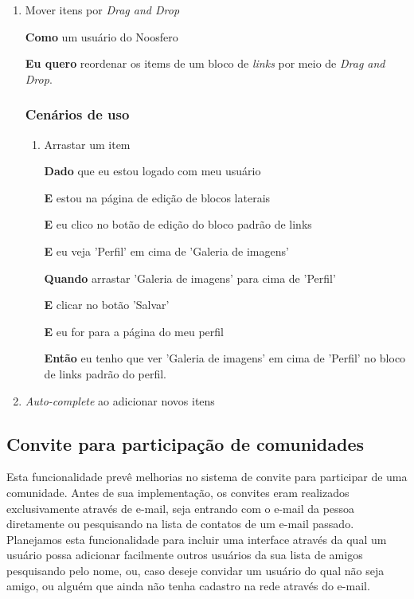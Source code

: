 \begin{enumerate}

\item Mover itens por \textit{Drag and Drop}

\textbf{Como} um usuário do Noosfero

\textbf{Eu quero} reordenar os items de um bloco de \textit{links} por meio de
\textit{Drag and Drop}.

\subsubsection*{Cenários de uso}

\begin{enumerate}

\item Arrastar um item

\textbf{Dado} que eu estou logado com meu usuário

\textbf{E} estou na página de edição de blocos laterais

\textbf{E} eu clico no botão de edição do bloco padrão de links

\textbf{E} eu veja 'Perfil' em cima de 'Galeria de imagens'

\textbf{Quando} arrastar 'Galeria de imagens' para cima de 'Perfil'

\textbf{E} clicar no botão 'Salvar'

\textbf{E} eu for para a página do meu perfil

\textbf{Então} eu tenho que ver 'Galeria de imagens' em cima de 'Perfil'
no bloco de links padrão do perfil.

\end{enumerate}

\item \textit{Auto-complete} ao adicionar novos itens

\end{enumerate}

\subsection{Convite para participação de comunidades}

Esta funcionalidade prevê melhorias no sistema de convite para participar de
uma comunidade. Antes de sua implementação, os convites eram realizados
exclusivamente através de e-mail, seja entrando com o e-mail da pessoa
diretamente ou pesquisando na lista de contatos de um e-mail passado. Planejamos
esta funcionalidade para incluir uma interface através da qual um usuário
possa adicionar facilmente outros usuários da sua lista de amigos pesquisando
pelo nome, ou, caso deseje convidar um usuário do qual não seja amigo, ou alguém
que ainda não tenha cadastro na rede através do e-mail.

